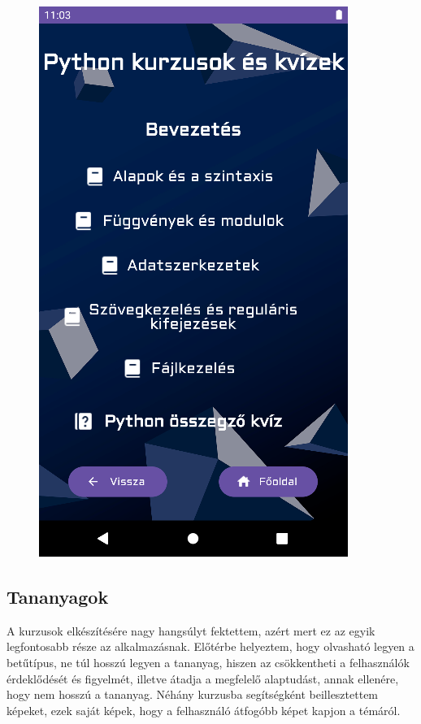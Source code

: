 \documentclass{thesis-ekf}
\begin{document}
\begin{figure}[htb]
{\begin{minipage}[t]{0.45\textwidth}
		\includegraphics[width=\textwidth]{pythonlista.png}
		\label{pythonlista}
	\end{minipage}}
\end{figure}
\pagebreak
\subsection{Tananyagok}
A kurzusok elkészítésére nagy hangsúlyt fektettem, azért mert ez az egyik legfontosabb része az alkalmazásnak. Előtérbe helyeztem, hogy olvasható legyen a betűtípus, ne túl hosszú legyen a tananyag, hiszen az csökkentheti a felhasználók érdeklődését és figyelmét, illetve átadja a megfelelő alaptudást, annak ellenére, hogy nem hosszú a tananyag. Néhány kurzusba segítségként beillesztettem képeket, ezek saját képek, hogy a felhasználó átfogóbb képet kapjon a témáról.
\end{document}
